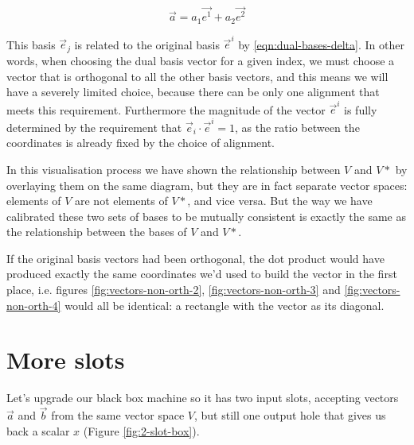 $$
\vec{a} = a_1 \vec{e^1} + a_2 \vec{e^2}
$$

This basis $\vec{e}_j$ is related to the original basis $\vec{e}^i$ by \eqref{eqn:dual-bases-delta}. In other words, when choosing the dual basis vector for a given index, we must choose a vector that is orthogonal to all the other basis vectors, and this means we will have a severely limited choice, because there can be only one alignment that meets this requirement. Furthermore the magnitude of the vector $\vec{e}^i$ is fully determined by the requirement that $\vec{e}_i \cdot \vec{e}^i = 1$, as the ratio between the coordinates is already fixed by the choice of alignment.

In this visualisation process we have shown the relationship between $V$ and $V*$ by overlaying them on the same diagram, but they are in fact separate vector spaces: elements of $V$ are not elements of $V*$, and vice versa. But the way we have calibrated these two sets of bases to be mutually consistent is exactly the same as the relationship between the bases of $V$ and $V*$.

If the original basis vectors had been orthogonal, the dot product would have produced exactly the same coordinates we'd used to build the vector in the first place, i.e. figures \ref{fig:vectors-non-orth-2}, \ref{fig:vectors-non-orth-3} and \ref{fig:vectors-non-orth-4} would all be identical: a rectangle with the vector as its diagonal.

\section{More slots}

Let's upgrade our black box machine so it has two input slots, accepting vectors $\vec{a}$ and $\vec{b}$ from the same vector space $V$, but still one output hole that gives us back a scalar $x$ (Figure \ref{fig:2-slot-box}).

